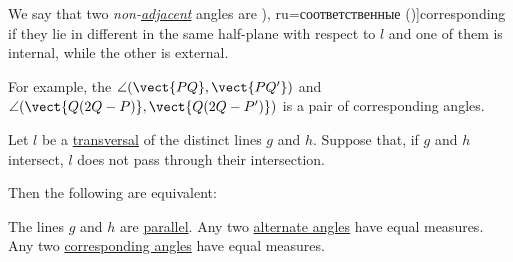 \begin{definition}
\begin{thmenum}
     We say that two \emph{non-\hyperref[def:adjacent_angles]{adjacent}} angles are \term[bg=съответни (\cite[\S 28]{Гюзелев1873Геометрія}), ru=соответственные (\cite[\S 72]{Киселёв2004Геометрия})]{corresponding} if they lie in different in the same half-plane with respect to \( l \) and one of them is internal, while the other is external.

    For example, the \( \angle(\vect{PQ}, \vect{PQ'}) \) and \( \angle(\vect{Q(2Q - P)}, \vect{Q(2Q - P')}) \) is a pair of corresponding angles.
  \end{thmenum}
\end{definition}

\begin{proposition}\label{thm:angles_of_transversal_parallel_lines}
  Let \( l \) be a \hyperref[def:transversal_line]{transversal} of the distinct lines \( g \) and \( h \). Suppose that, if \( g \) and \( h \) intersect, \( l \) does not pass through their intersection.

  Then the following are equivalent:
  \begin{thmenum}
     The lines \( g \) and \( h \) are \hyperref[def:affine_parallelism]{parallel}.
     Any two \hyperref[def:angles_of_transversal/alternate]{alternate angles} have equal measures.
     Any two \hyperref[def:angles_of_transversal/corresponding]{corresponding angles} have equal measures.
  \end{thmenum}
\end{proposition}

